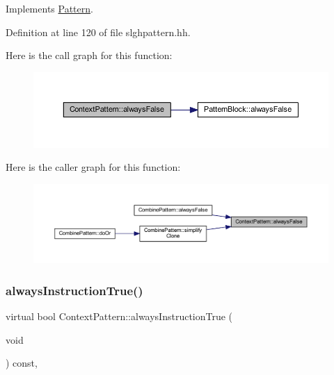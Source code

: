 Implements \mbox{\hyperlink{class_pattern_ab7e66817fda44ad29954c8cfcb9c9266}{Pattern}}.



Definition at line 120 of file slghpattern.\+hh.

Here is the call graph for this function\+:
\nopagebreak
\begin{figure}[H]
\begin{center}
\leavevmode
\includegraphics[width=350pt]{class_context_pattern_a61a99b63f09aed4e7a18933eba517b90_cgraph}
\end{center}
\end{figure}
Here is the caller graph for this function\+:
\nopagebreak
\begin{figure}[H]
\begin{center}
\leavevmode
\includegraphics[width=350pt]{class_context_pattern_a61a99b63f09aed4e7a18933eba517b90_icgraph}
\end{center}
\end{figure}
\mbox{\label{class_context_pattern_addfef0aa6b03d6d6c3cce66bd64b903d}} 
\subsubsection{\texorpdfstring{alwaysInstructionTrue()}{alwaysInstructionTrue()}}
{\footnotesize\ttfamily virtual bool Context\+Pattern\+::always\+Instruction\+True (\begin{DoxyParamCaption}\item[{void}]{ }\end{DoxyParamCaption}) const\hspace{0.3cm}{\ttfamily [inline]}, {\ttfamily [virtual]}}



